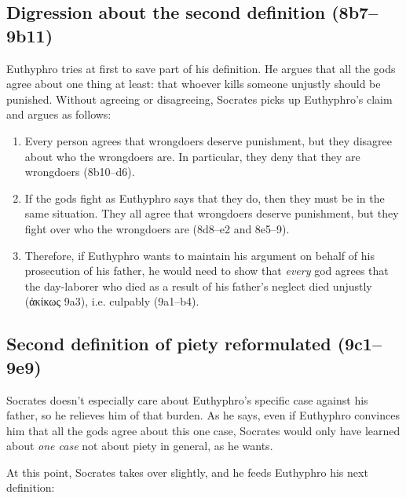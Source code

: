 \documentclass[11pt]{article}
\begin{document}

\subsection{Digression about the second definition (8b7--9b11)}

Euthyphro tries at first to save part of his definition.  He argues that all the gods agree about one thing at least: that whoever kills someone unjustly should be punished.  Without agreeing or disagreeing, Socrates picks up Euthyphro's claim and argues as follows:

\begin{enumerate}

    \item Every person agrees that wrongdoers deserve punishment, but they disagree about who the wrongdoers are.  In particular, they deny that they are wrongdoers (8b10--d6).

    \item If the gods fight as Euthyphro says that they do, then they must be in the same situation.  They all agree that wrongdoers deserve punishment, but they fight over who the wrongdoers are (8d8--e2 and 8e5--9).

    \item Therefore, if Euthyphro wants to maintain his argument on behalf of his prosecution of his father, he would need to show that \emph{every} god agrees that the day-laborer who died as a result of his father's neglect died unjustly ({\g ἀκίκως} 9a3), i.e. culpably (9a1--b4).

\end{enumerate}


\subsection{Second definition of piety reformulated (9c1--9e9)}

Socrates doesn't especially care about Euthyphro's specific case against his father, so he relieves him of that burden.  As he says, even if Euthyphro convinces him that all the gods agree about this one case, Socrates would only have learned about \emph{one case} not about piety in general, as he wants.

At this point, Socrates takes over slightly, and he feeds Euthyphro his next definition:
\end{document}
